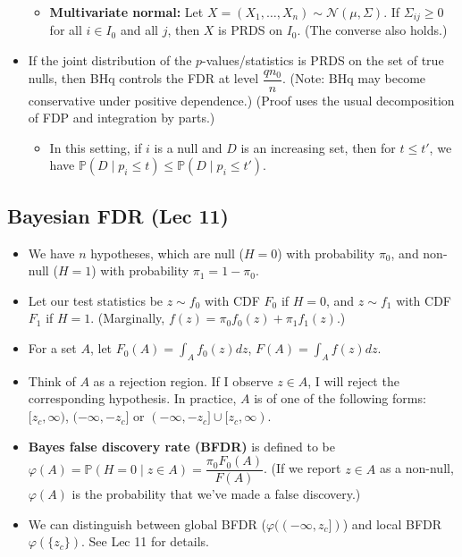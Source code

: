 \documentclass[twoside]{article}
\newcommand\dis{\displaystyle}
\newcommand\bbP{\mathbb{P}}
\newcommand\calN{\mathcal{N}}
\newcommand\Sg{\Sigma}
\begin{document}
\begin{itemize}
\begin{itemize}
\item \textbf{Multivariate normal:} Let $X = (X_1, \dots, X_n) \sim \calN(\mu, \Sg)$. If $\Sg_{ij} \geq 0$ for all $i \in I_0$ and all $j$, then $X$ is PRDS on $I_0$. (The converse also holds.)
\end{itemize}

\item If the joint distribution of the $p$-values/statistics is PRDS on the set of true nulls, then BHq controls the FDR at level $\dfrac{qn_0}{n}$. (Note: BHq may become conservative under positive dependence.) (Proof uses the usual decomposition of FDP and integration by parts.)
\begin{itemize}
\item In this setting, if $i$ is a null and $D$ is an increasing set, then for $t \leq t'$, we have $\bbP(D \mid p_i \leq t) \leq \bbP(D \mid p_i \leq t')$.
\end{itemize}

\end{itemize}

\subsection{Bayesian FDR (Lec 11)}
\begin{itemize}
\item We have $n$ hypotheses, which are null ($H = 0$) with probability $\pi_0$, and non-null ($H = 1$) with probability $\pi_1 = 1 - \pi_0$.

\item Let our test statistics be $z \sim f_0$ with CDF $F_0$ if $H=0$, and $z \sim f_1$ with CDF $F_1$ if $H=1$. (Marginally, $f(z) = \pi_0 f_0(z) + \pi_1 f_1(z)$.)

\item For a set $A$, let $F_0(A) = \dis\int_A f_0(z)dz$, $F(A) = \dis\int_A f(z) dz$.

\item Think of $A$ as a rejection region. If I observe $z \in A$, I will reject the corresponding hypothesis. In practice, $A$ is of one of the following forms: $[z_c, \infty)$, $(-\infty, -z_c]$ or $(-\infty, -z_c] \cup [z_c, \infty)$.

\item \textbf{Bayes false discovery rate (BFDR)} is defined to be $\varphi (A) = \bbP(H = 0 \mid z \in A) = \dfrac{\pi_0 F_0(A)}{F(A)}$. (If we report $z \in A$ as a non-null, $\varphi(A)$ is the probability that we've made a false discovery.)

\item We can distinguish between global BFDR ($\varphi((-\infty, z_c])$) and local BFDR $\varphi(\{z_c\})$. See Lec 11 for details.

\end{itemize}
\end{document}
